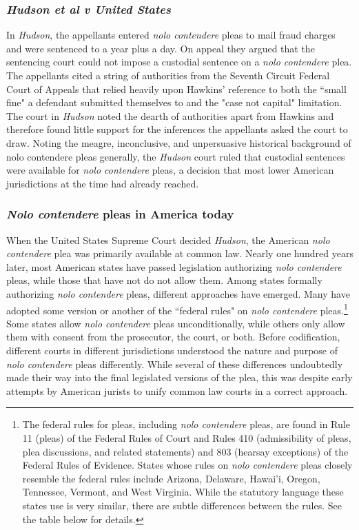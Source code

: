 \subsubsection{\textit{Hudson et al v United States}}

In \textit{Hudson}, the appellants entered \textit{nolo contendere} pleas to mail fraud charges and were sentenced to a year plus a day. On appeal they argued that the sentencing court could not impose a custodial sentence on a \textit{nolo contendere} plea. The appellants cited a string of authorities from the Seventh Circuit Federal Court of Appeals that relied heavily upon Hawkins' reference to both the ``small fine" a defendant submitted themselves to and the "case not capital" limitation. The court in \textit{Hudson} noted the dearth of authorities apart from Hawkins and therefore found little support for the inferences the appellants asked the court to draw. Noting the meagre, inconclusive, and unpersuasive historical background of nolo contendere pleas generally, the \textit{Hudson} court ruled that custodial sentences were available for \textit{nolo contendere} pleas, a decision that most lower American jurisdictions at the time had already reached.

\subsubsection{\textit{Nolo contendere} pleas in America today}

When the United States Supreme Court decided \textit{Hudson}, the American \textit{nolo contendere} plea was primarily available at common law. Nearly one hundred years later, most American states have passed legislation authorizing \textit{nolo contendere} pleas, while those that have not do not allow them. Among states formally authorizing \textit{nolo contendere} pleas, different approaches have emerged. Many have adopted some version or another of the ``federal rules" on \textit{nolo contendere} pleas.\footnote{The federal rules for pleas, including \textit{nolo contendere} pleas, are found in Rule 11 (pleas) of the Federal Rules of Court and Rules 410 (admissibility of pleas, plea discussions, and related statements) and 803 (hearsay exceptions) of the Federal Rules of Evidence. States whose rules on \textit{nolo contendere} pleas closely resemble the federal rules include Arizona, Delaware, Hawai'i, Oregon, Tennessee, Vermont, and West Virginia. While the statutory language these states use is very similar, there are subtle differences between the rules. See the table below for details.} Some states allow \textit{nolo contendere} pleas unconditionally, while others only allow them with consent from the prosecutor, the court, or both. Before codification, different courts in different jurisdictions understood the nature and purpose of \textit{nolo contendere} pleas differently. While several of these differences undoubtedly made their way into the final legislated versions of the plea, this was despite early attempts by American jurists to unify common law courts in a correct approach.

